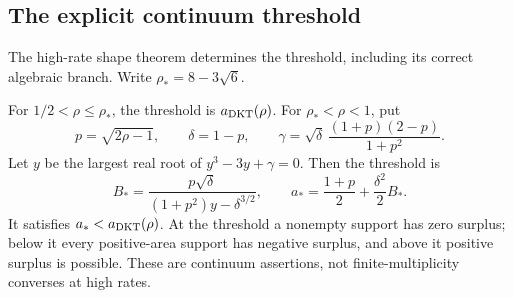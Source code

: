 \subsection{The explicit continuum threshold}

The high-rate shape theorem determines the threshold, including its
correct algebraic branch. Write $\rho_*=8-3\sqrt6$.
\begin{theorem}
For $1/2<\rho\le\rho_*$, the threshold is $a_{\rm DKT}(\rho)$.
For $\rho_*<\rho<1$, put
\[
 p=\sqrt{2\rho-1},\qquad \delta=1-p,\qquad
 \gamma=\sqrt\delta\,\frac{(1+p)(2-p)}{1+p^2}.
\]
Let $y$ be the largest real root of $y^3-3y+\gamma=0$. Then the threshold is
\begin{equation}\label{eq:high-threshold}
 B_* =\frac{p\sqrt\delta}{(1+p^2)y-\delta^{3/2}},
 \qquad a_* =\frac{1+p}{2}+\frac{\delta^2}{2}B_*.
\end{equation}
It satisfies $a_*<a_{\rm DKT}(\rho)$. At the threshold a nonempty
support has zero surplus; below it every positive-area support has
negative surplus, and above it positive surplus is possible.
These are continuum assertions, not finite-multiplicity converses
at high rates.
\end{theorem}
